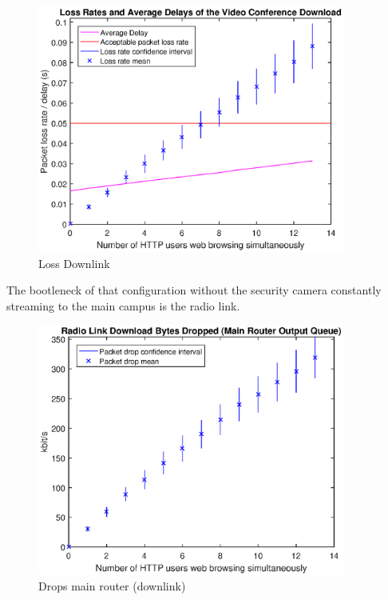 \documentclass[a4paper,10pt]{book}\usepackage{graphicx}
\begin{document}
\begin{figure}[!ht]
  \begin{center}
    \includegraphics[width=0.9\textwidth]{off_loss_conf_download.eps} 
    \caption{Loss Downlink}
    \label{fig:losslecdown} 
  \end{center}
\end{figure}
The bootleneck of that configuration without the security camera constantly streaming to the main campus 
is the radio link.
\begin{figure}[!ht]
  \begin{center}
  \includegraphics[width=0.9\textwidth]{off_main_router_drops.eps}
    \caption{Drops main router (downlink)}
  \label{fig:mainRdrops}
  \end{center}
\end{figure}
\end{document}

